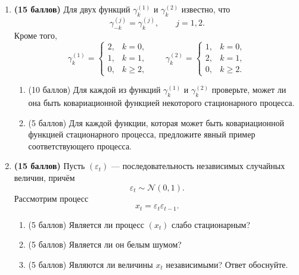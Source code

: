 \documentclass[12pt]{article}
\newcommand \e{\varepsilon}
\newcommand \cN{\mathcal{N}}
\begin{document}
\begin{enumerate}
    \item \textbf{(15 баллов)} Для двух функций $\gamma_k^{(1)}$ и $\gamma_k^{(2)}$ известно, что
    \[
    \gamma_{-k}^{(j)}=\gamma_k^{(j)}, \qquad j=1,2.
    \]
    Кроме того,
    \[
    \gamma_k^{(1)}=
    \begin{cases}
    2, & k=0,\\
    1, & k=1,\\
    0, & k\geq 2,
    \end{cases}
    \qquad
    \gamma_k^{(2)}=
    \begin{cases}
    1, & k=0,\\
    2, & k=1,\\
    0, & k\geq 2.
    \end{cases}
    \]

    \begin{enumerate}
        \item (10 баллов) Для каждой из функций $\gamma_k^{(1)}$ и $\gamma_k^{(2)}$ проверьте, может ли она быть ковариационной функцией некоторого стационарного процесса.
        \item (5 баллов) Для каждой функции, которая может быть ковариационной функцией стационарного процесса, предложите явный пример соответствующего процесса.
    \end{enumerate}

    \item \textbf{(15 баллов)} Пусть $(\e_t)$ --- последовательность независимых случайных величин, причём
    \[
    \e_t \sim \cN(0,1).
    \]
    Рассмотрим процесс
    \[
    x_t = \e_t \e_{t-1}.
    \]

    \begin{enumerate}
        \item (5 баллов) Является ли процесс $(x_t)$ слабо стационарным?
        \item (5 баллов) Является ли он белым шумом?
        \item (5 баллов) Являются ли величины $x_t$ независимыми? Ответ обоснуйте.
    \end{enumerate}

\end{enumerate}
\end{document}
